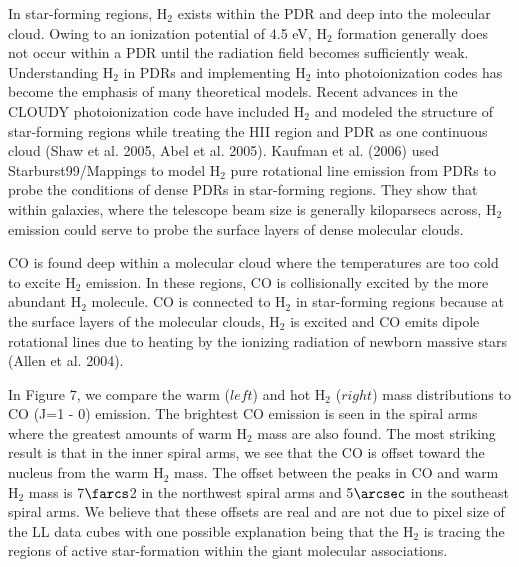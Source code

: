 \documentclass[manuscript]{aastex}
\begin{document}
In star-forming regions, $\mathrm{H_2}$ exists within the PDR and deep into the molecular cloud.  Owing to an ionization potential of 4.5 eV, $\mathrm{H_2}$ formation generally does not occur within a PDR until the radiation field  becomes sufficiently weak.  Understanding $\mathrm{H_2}$ in PDRs and implementing $\mathrm{H_2}$ into photoionization codes has become the emphasis of many theoretical models.  Recent advances in the CLOUDY photoionization code have included $\mathrm{H_2}$ and modeled the structure of star-forming regions while treating the HII region and PDR as one continuous cloud (Shaw et al. 2005, Abel et al. 2005).  Kaufman et al. (2006) used Starburst99/Mappings to model $\mathrm{H_2}$ pure rotational line emission from PDRs to probe the conditions of dense PDRs in star-forming regions.  They show that within galaxies, where the telescope beam size is generally kiloparsecs across, $\mathrm{H_2}$ emission could serve to probe the surface layers of dense molecular clouds.

CO is found deep within a molecular cloud where the temperatures are too cold to excite $\mathrm{H_2}$ emission.  In these regions, CO is collisionally excited by the more abundant $\mathrm{H_2}$ molecule.  CO is connected to $\mathrm{H_2}$ in star-forming regions because at the surface layers of the molecular clouds, $\mathrm{H_2}$ is excited and CO emits dipole rotational lines due to heating by the ionizing radiation of newborn massive stars (Allen et al. 2004). 

In Figure 7, we compare the warm ($left$) and hot $\mathrm{H_2}$ ($right$) mass distributions to CO (J=1 - 0) emission.  The brightest CO emission is seen in the spiral arms where the greatest amounts of warm $\mathrm{H_2}$ mass are also found.  The most striking result is that in the inner spiral arms, we see that the CO is offset toward the nucleus from the warm $\mathrm{H_2}$ mass.  The offset between the peaks in CO and warm $\mathrm{H_2}$ mass is 7$\farcs$2 in the northwest spiral arms and 5$\arcsec$ in the southeast spiral arms.  We believe that these offsets are real and are not due to pixel size of the LL data cubes with one possible explanation being that the $\mathrm{H_2}$ is tracing the regions of active star-formation within the giant molecular associations.
\end{document}
